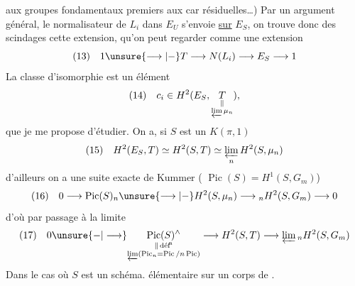 aux groupes fondamentaux premiers aux car résiduelles\dots) Par un argument général, le normalisateur de $L_i$ dans $E_U$ s'envoie \uline{sur} $E_S$, on trouve donc des scindages  cette extension, qu'on peut regarder comme une extension
\[
(13)\quad 1\unsure{\longrightarrow|-}T\longrightarrow N(L_i)\longrightarrow E_S\longrightarrow1
\]
La classe d'isomorphie est un élément 
\[
(14)\quad c_i\in H^2(E_S,\underset{\substack{\Vert\\\varprojlim\mu_n}}{T}),
\]
que je me propose d'étudier. On a, si $S$ est un $K(\pi,1)$
\[
(15)\quad H^2(E_S,T)\simeq H^2(S,T)\simeq\varprojlim_n H^2(S,\mu_n)
\]
d'ailleurs on a une suite exacte de Kummer ( $\operatorname{Pic}(S)=H^1(S,G_m)$)
\[
(16)\quad 0\longrightarrow\operatorname{Pic}(S)_n\unsure{\longrightarrow|-} H^2(S,\mu_n)\longrightarrow {}_nH^2(S,G_m)\longrightarrow0
\]
d'où par passage à la limite
\[
(17)\quad 0\unsure{-|\longrightarrow}
\underset{\substack{\Vert\,\text{déf}\!^{\mathrm n}\\\varprojlim(\operatorname{Pic}_n=\operatorname{Pic}/n\operatorname{Pic})}}{\operatorname{Pic}(S)^\wedge}
\longrightarrow H^2(S,T)\longrightarrow\varprojlim {}_nH^2(S,G_m)
\]
Dans le cas où $S$ est un schéma. élémentaire sur un corps de . 
